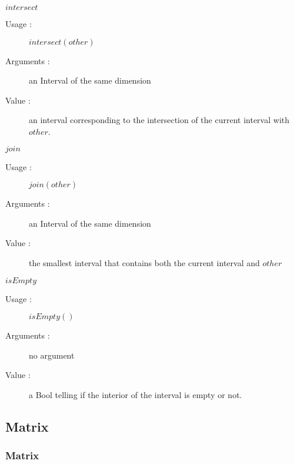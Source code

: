 \begin{description}
\begin{description}
  \item $intersect$
    \begin{description}
    \item[Usage :] $intersect(other)$
    \item[Arguments :] an Interval of the same dimension
    \item[Value :] an interval corresponding to the intersection of the current interval with $other$.
    \end{description}
    \bigskip

  \item $join$
    \begin{description}
    \item[Usage :] $join(other)$
    \item[Arguments :] an Interval of the same dimension
    \item[Value :] the smallest interval that contains both the current interval and $other$
    \end{description}
    \bigskip

  \item $isEmpty$
    \begin{description}
    \item[Usage :] $isEmpty()$
    \item[Arguments :] no argument
    \item[Value :] a Bool telling if the interior of the interval is empty or not.
    \end{description}

  \end{description}

\end{description}


\newpage \subsection{Matrix}

 \subsubsection{Matrix}

